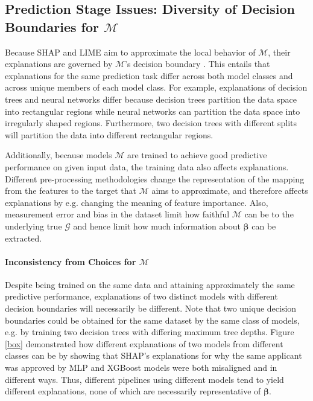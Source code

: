 \documentclass[mnsc,blindrev]{informs3}
\begin{document}
    \subsection{Prediction Stage Issues: Diversity of Decision Boundaries for $\mathcal{M}$}
        \label{sec:rashomon_overfitting}
        Because SHAP and LIME aim to approximate the local behavior of $\mathcal{M}$, their explanations are governed by $\mathcal{M}$'s decision boundary \citep{han22which}. This entails that explanations for the same prediction task differ across both model classes and across unique members of each model class. For example, explanations of decision trees and neural networks differ because decision trees partition the data space into rectangular regions while neural networks can partition the data space into irregularly shaped regions. Furthermore, two decision trees with different splits will partition the data into different rectangular regions. 

        Additionally, because models $\mathcal{M}$ are trained to achieve good predictive performance on given input data, the training data also affects explanations. Different pre-processing methodologies change the representation of the mapping from the features to the target that $\mathcal{M}$ aims to approximate, and therefore affects explanations by e.g. changing the meaning of feature importance. Also, measurement error and bias in the dataset limit how faithful $\mathcal{M}$ can be to the underlying true $\mathcal{G}$ and hence limit how much information about $\boldsymbol{\beta}$ can be extracted. 
        


        \paragraph{\textbf{Inconsistency from  Choices for $\mathcal{M}$}}
        Despite being trained on the same data and attaining approximately the same predictive performance, explanations of two distinct models with different decision boundaries will necessarily be different. Note that two unique decision boundaries could be obtained for the same dataset by the same class of models, e.g. by training two decision trees with differing maximum tree depths. Figure \ref{box} demonstrated how different explanations of two models from different classes can be by showing that SHAP's explanations for why the same applicant was approved by MLP and XGBoost models were both misaligned and in different ways. Thus, different pipelines using different models tend to yield different explanations, none of which are necessarily representative of $\boldsymbol{\beta}$.
\end{document}
